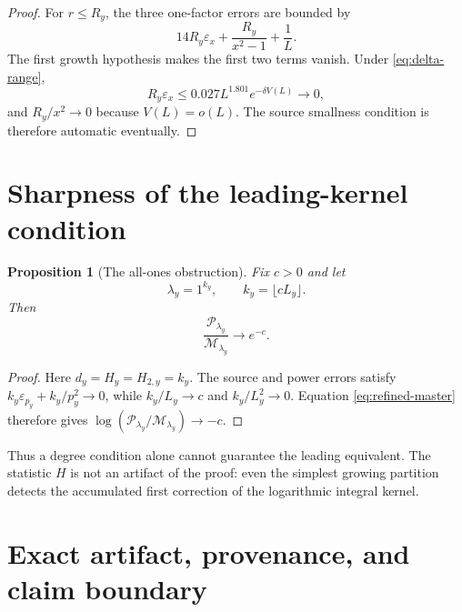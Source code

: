 \documentclass[11pt]{article}
\newtheorem{proposition}[theorem]{Proposition}
\theoremstyle{definition}
\theoremstyle{remark}
\newcommand{\eps}{\varepsilon}
\newcommand{\cP}{\mathcal P}
\newcommand{\cM}{\mathcal M}
\begin{document}
\begin{proof}
For $r\le R_y$, the three one-factor errors are bounded by
\[
 14R_y\eps_x+\frac{R_y}{x^2-1}+\frac1L.
\]
The first growth hypothesis makes the first two terms vanish.  Under
\eqref{eq:delta-range},
\[
 R_y\eps_x\le0.027L^{1.801}e^{-\delta V(L)}\longrightarrow0,
\]
and $R_y/x^2\to0$ because $V(L)=o(L)$.  The source smallness condition is
therefore automatic eventually.
\end{proof}

\section{Sharpness of the leading-kernel condition}

\begin{proposition}[The all-ones obstruction]
\label{prop:sharpness}
Fix $c>0$ and let
\[
 \lambda_y=1^{k_y},\qquad k_y=\lfloor cL_y\rfloor.
\]
Then
\begin{equation}
 \frac{\cP_{\lambda_y}}{\cM_{\lambda_y}}\longrightarrow e^{-c}.
 \label{eq:sharpness}
\end{equation}
\end{proposition}

\begin{proof}
Here $d_y=H_y=H_{2,y}=k_y$.  The source and power errors satisfy
$k_y\eps_{p_y}+k_y/p_y^2\to0$, while $k_y/L_y\to c$ and
$k_y/L_y^2\to0$.  Equation \eqref{eq:refined-master} therefore gives
$\log(\cP_{\lambda_y}/\cM_{\lambda_y})\to-c$.
\end{proof}

Thus a degree condition alone cannot guarantee the leading equivalent.
The statistic $H$ is not an artifact of the proof: even the simplest
growing partition detects the accumulated first correction of the
logarithmic integral kernel.

\section{Exact artifact, provenance, and claim boundary}
\label{sec:artifact}
\end{document}
